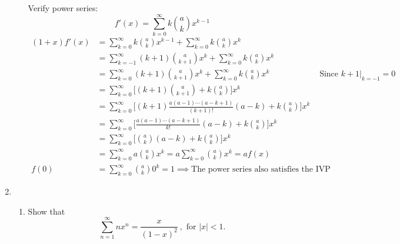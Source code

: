 \documentclass{article}
\begin{document}
\begin{enumerate}[label=(\arabic*)]
\begin{enumerate}
                Verify power series:
                \[f'(x) = \sum_{k=0}^{\infty}k\binom{a}{k}x^{k-1}\]
                \begin{align*}
                    (1+x)f'(x) &= \sum_{k=0}^\infty k\binom{a}{k} x^{k-1} + \sum_{k=0}^\infty k\binom{a}{k} x^k \\
                    &= \sum_{k=-1}^\infty (k+1)\binom{a}{k+1} x^{k} + \sum_{k=0}^\infty k\binom{a}{k} x^k \\
                    &= \sum_{k=0}^\infty (k+1)\binom{a}{k+1} x^{k} + \sum_{k=0}^\infty k\binom{a}{k} x^k &\text{ Since } k+1|_{k=-1} = 0 \\
                    &= \sum_{k=0}^\infty \Bigg[ (k+1)\binom{a}{k+1} +  k\binom{a}{k} \Bigg] x^k \\
                    &= \sum_{k=0}^\infty \Bigg[ (k+1)\frac{a(a-1)\cdots(a-k+1)}{(k+1)!}(a-k) + k\binom{a}{k} \Bigg] x^k \\
                    &= \sum_{k=0}^\infty \Bigg[ \frac{a(a-1)\cdots(a-k+1)}{k!}(a-k) + k\binom{a}{k} \Bigg] x^k \\
                    &= \sum_{k=0}^\infty \Bigg[ \binom{a}{k}(a-k) + k\binom{a}{k} \Bigg] x^k \\
                    &= \sum_{k=0}^\infty a \binom{a}{k} x^k = a \sum_{k=0}^\infty \binom{a}{k} x^k = af(x) \\
                    f(0) &= \sum_{k=0}^\infty \binom{a}{k} 0^k = 1 \implies \text{The power series also satisfies the IVP}
                \end{align*}
        \end{enumerate}
    \newpage
    \item 
        \begin{enumerate}
            \item Show that
                \[\sum_{n=1}^{\infty}nx^n = \frac{x}{(1-x)^2}\ , \text{ for } |x| < 1.\]


\end{enumerate}
\end{enumerate}
\end{document}
